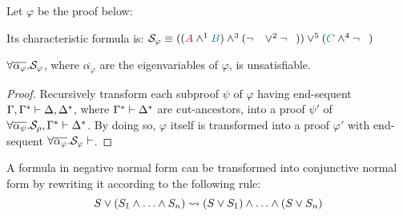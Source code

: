 \begin{example}
\label{example:CutPertinentStruct}

Let $\varphi$ be the proof below:
\begin{prooftree}
		 
	 
						 
					 
					 
									 
								 
\end{prooftree}

\noindent
Its characteristic formula is:
$
\struct{\varphi} 
\equiv 
((\hA{A} \structplus^1 \hB{B}) \structplus^3 (\structdual{\hC{B}} \structtimes^2 \structdual{\hD{A}}))
\structtimes^5
(\hE{C} \structplus^4 \structdual{\hF{C}})
$
\hfill\QED
\end{example}

\begin{theorem}
\label{theorem:Unsatisfiability}
$\all \overline{\alpha_{\varphi}}. \struct{\varphi}$, where $\overline{\alpha_{\varphi}}$ are the eigenvariables of $\varphi$, is unsatisfiable. 
\end{theorem}
\begin{proof}
Recursively transform each subproof $\psi$ of $\varphi$ having end-sequent $\Gamma, \Gamma^* \seq \Delta, \Delta^*$, where $\Gamma^* \seq \Delta^*$ are cut-ancestors, into a proof $\psi'$ of $\all \overline{\alpha_{\psi}}. \struct{\rho}, \Gamma^* \seq \Delta^*$. By doing so, $\varphi$ itself is transformed into a proof $\varphi'$ with end-sequent $\all \overline{\alpha_{\varphi}}. \struct{\varphi} \seq$.
\end{proof}






\begin{definition}
\label{definition:NormalizationPlusTimes}
A formula in negative normal form can be transformed into conjunctive normal form by rewriting it according to the following rule:
$$
S \structtimes (S_1 \structplus \ldots \structplus S_n)   \normalizePlusTimes  (S \structtimes S_1) \structplus \ldots \structplus (S \structtimes S_n) 
$$
\end{definition}


